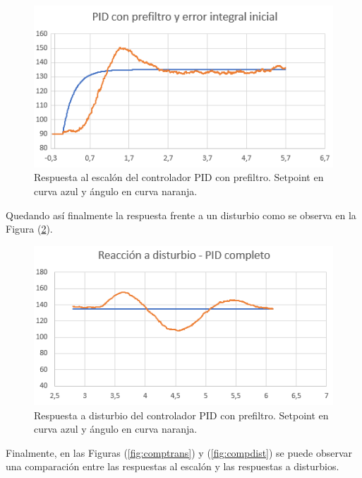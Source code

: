 \begin{figure}[H]
    \centering
    \includegraphics[width=\textwidth]{./Imagenes/pidcompleto.png}
    \caption{Respuesta al escalón del controlador PID con prefiltro. Setpoint en curva azul y ángulo en curva naranja.}
    \label{fig:pidcompleto}
\end{figure}

Quedando así finalmente la respuesta frente a un disturbio como se observa en la Figura (\ref{fig:piddist}).

\begin{figure}[H]
    \centering
    \includegraphics[width=\textwidth]{./Imagenes/piddist.png}
    \caption{Respuesta a disturbio del controlador PID con prefiltro. Setpoint en curva azul y ángulo en curva naranja.}
    \label{fig:piddist}
\end{figure}

Finalmente, en las Figuras (\ref{fig:comptrans}) y (\ref{fig:compdist}) se puede observar una comparación entre las respuestas al escalón y las respuestas a disturbios.

